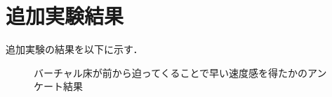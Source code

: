 \appendix
\chapter{追加実験結果}
追加実験の結果を以下に示す．
\begin{figure}[H]
    \centering
    \caption{バーチャル床が前から迫ってくることで早い速度感を得たかのアンケート結果}
    \label{fig:f1}
\end{figure}
